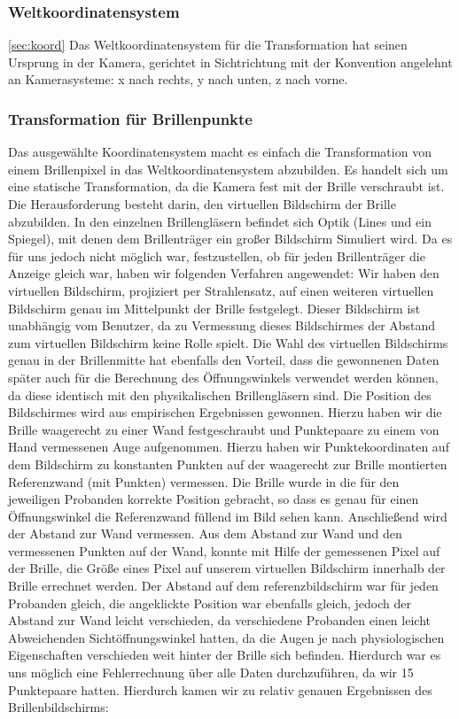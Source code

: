 \subsubsection*{Weltkoordinatensystem}
\ref{sec:koord}
Das Weltkoordinatensystem für die Transformation hat seinen Ursprung in der Kamera, gerichtet in Sichtrichtung mit der Konvention angelehnt an Kamerasysteme: x nach rechts, y nach unten, z nach vorne.

\subsubsection*{Transformation für Brillenpunkte}
Das ausgewählte Koordinatensystem macht es einfach die Transformation von einem Brillenpixel in das Weltkoordinatensystem abzubilden. 
Es handelt sich um eine statische Transformation, da die Kamera fest mit der Brille verschraubt ist. 
Die Herausforderung besteht darin, den virtuellen Bildschirm der Brille abzubilden. In den einzelnen Brillengläsern befindet sich Optik (Lines und ein Spiegel), mit denen dem Brillenträger ein großer Bildschirm Simuliert wird. 
Da es für uns jedoch nicht möglich war, festzustellen, ob für jeden Brillenträger die Anzeige gleich war, haben wir folgenden Verfahren angewendet: 
Wir haben den virtuellen Bildschirm, projiziert per Strahlensatz, auf einen weiteren virtuellen Bildschirm genau im Mittelpunkt der Brille festgelegt. 
Dieser Bildschirm ist unabhängig vom Benutzer, da zu Vermessung dieses Bildschirmes der Abstand zum virtuellen Bildschirm keine Rolle spielt.
Die Wahl des virtuellen Bildschirms genau in der Brillenmitte hat ebenfalls den Vorteil, dass die gewonnenen Daten später auch für die Berechnung des Öffnungswinkels verwendet werden können, da diese identisch mit den physikalischen Brillengläsern sind.
Die Position des Bildschirmes wird aus empirischen Ergebnissen gewonnen. 
Hierzu haben wir die Brille waagerecht zu einer Wand festgeschraubt und Punktepaare zu einem von Hand vermessenen Auge aufgenommen. 
Hierzu haben wir Punktekoordinaten auf dem Bildschirm zu konstanten Punkten auf der waagerecht zur Brille montierten Referenzwand (mit Punkten) vermessen. 
Die Brille wurde in die für den jeweiligen Probanden korrekte Position gebracht, so dass es genau für einen Öffnungswinkel die Referenzwand füllend im Bild sehen kann. 
Anschließend wird der Abstand zur Wand vermessen. 
Aus dem Abstand zur Wand und den vermessenen Punkten auf der Wand, konnte mit Hilfe der gemessenen Pixel auf der Brille, die Größe eines Pixel auf unserem virtuellen Bildschirm innerhalb der Brille errechnet werden. 
Der Abstand auf dem referenzbildschirm war für jeden Probanden gleich, die angeklickte Position war ebenfalls gleich, jedoch der Abstand zur Wand leicht verschieden, da verschiedene Probanden einen leicht Abweichenden Sichtöffnungswinkel hatten, da die Augen je nach physiologischen Eigenschaften verschieden weit hinter der Brille sich befinden. 
Hierdurch war es uns möglich eine Fehlerrechnung über alle Daten durchzuführen, da wir 15 Punktepaare hatten. 
Hierdurch kamen wir zu relativ genauen Ergebnissen des Brillenbildschirms:

